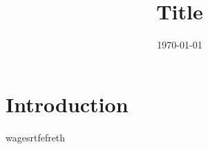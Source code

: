 \documentclass{article}
\begin{document}
\title{\textbf{Title}}
\author{}
\date{\today}
\maketitle
{}
\newpage
{}
\tableofcontents
\section{Introduction}
wagesrtfefreth
\end{document}
